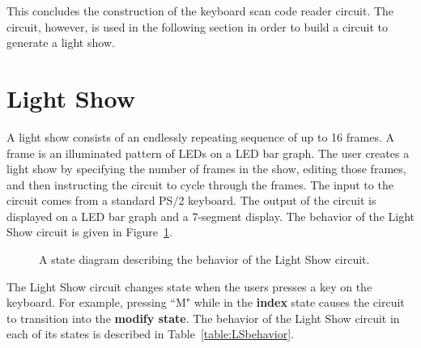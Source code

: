 This concludes the construction of the keyboard scan code reader circuit.
The circuit, however, is used in the following section in order to build a
circuit to generate a light show.


\pagebreak
\section{Light Show}

A light show consists of an endlessly repeating sequence of up to 16 frames. 
A frame is an illuminated pattern of LEDs on a LED bar graph. The user 
creates a light show by specifying the number of frames in the show, editing 
those frames, and then instructing the circuit to cycle through the frames. 
The input to the circuit comes from a standard PS/2 keyboard. The output of 
the circuit is displayed on a LED bar graph and a 7-segment display. The 
behavior of the Light Show circuit is given in Figure~\ref{fig:datapathControlLSbehavior}.
 
\begin{figure}[ht]
\caption{A state diagram describing the behavior of the Light Show circuit.}
\label{fig:datapathControlLSbehavior}
\end{figure}

The Light Show circuit changes state when the users presses a key on 
the keyboard. For example, pressing ``M" while in the \textbf{ index } state causes 
the circuit to transition into the \textbf{ modify state}. The behavior of the 
Light Show circuit in each of its states is described in 
Table~\ref{table:LSbehavior}.

